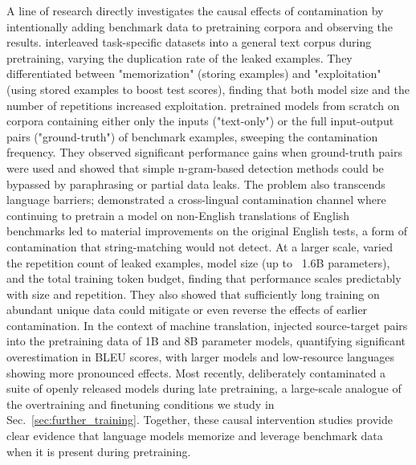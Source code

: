 A line of research directly investigates the causal effects of contamination by intentionally adding benchmark data to pretraining corpora and observing the results. \citet{magar2022data} interleaved task-specific datasets into a general text corpus during pretraining, varying the duplication rate of the leaked examples. They differentiated between "memorization" (storing examples) and "exploitation" (using stored examples to boost test scores), finding that both model size and the number of repetitions increased exploitation. \citet{jiang2024investigatingdatacontaminationpretraining} pretrained models from scratch on corpora containing either only the inputs ("text-only") or the full input-output pairs ("ground-truth") of benchmark examples, sweeping the contamination frequency. They observed significant performance gains when ground-truth pairs were used and showed that simple n-gram-based detection methods could be bypassed by paraphrasing or partial data leaks. The problem also transcends language barriers; \citet{yao2024data} demonstrated a cross-lingual contamination channel where continuing to pretrain a model on non-English translations of English benchmarks led to material improvements on the original English tests, a form of contamination that string-matching would not detect. At a larger scale, \citet{bordt2025howmuch} varied the repetition count of leaked examples, model size (up to ~1.6B parameters), and the total training token budget, finding that performance scales predictably with size and repetition. They also showed that sufficiently long training on abundant unique data could mitigate or even reverse the effects of earlier contamination. In the context of machine translation, \citet{kocyigit2025overestimation} injected source-target pairs into the pretraining data of 1B and 8B parameter models, quantifying significant overestimation in BLEU scores, with larger models and low-resource languages showing more pronounced effects. Most recently, \citet{godey2025gaperon} deliberately contaminated a suite of openly released models during late pretraining, a large-scale analogue of the overtraining and finetuning conditions we study in Sec.~\ref{sec:further_training}. Together, these causal intervention studies provide clear evidence that language models memorize and leverage benchmark data when it is present during pretraining.

